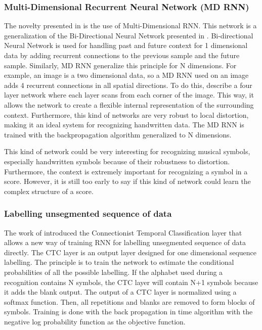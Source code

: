 \documentclass[11pt]{sdm}
\begin{document}
\subsubsection{Multi-Dimensional Recurrent Neural Network (MD RNN)}

The novelty presented in \cite{graves_offline_2009} is the use of Multi-Dimensional RNN.
This network is a generalization of the Bi-Directional Neural Network presented in \cite{schuster_bidirectional_1997}.
Bi-directional Neural Network is used for handling past and future context for 1 dimensional data by adding recurrent connections to the previous sample and the future sample.
Similarly, MD RNN generalize this principle for N dimensions.
For example, an image is a two dimensional data, so a MD RNN used on an image adds 4 recurrent connections in all spatial directions.
To do this, \cite{graves_offline_2009} describe a four layer network where each layer scans from each corner of the image.
This way, it allows the network to create a flexible internal representation of the surrounding context.
Furthermore, this kind of networks are very robust to local distortion, making it an ideal system for recognizing handwritten data.
The MD RNN is trained with the backpropagation algorithm generalized to N dimensions.

This kind of network could be very interesting for recognizing musical symbols, especially handwritten symbols because of their robustness to distortion.
Furthermore, the context is extremely important for recognizing a symbol in a score.
However, it is still too early to say if this kind of network could learn the complex structure of a score.

\subsubsection{Labelling unsegmented sequence of data}

The work of \cite{graves_connectionist_2006} introduced the Connectionist Temporal Classification layer that allows a new way of training RNN for labelling unsegmented sequence of data directly.
The CTC layer is an output layer designed for one dimensional sequence labelling.
The principle is to train the network to estimate the conditional probabilities of all the possible labelling.
If the alphabet used during a recognition contains N symbols, the CTC layer will contain N+1 symbols because it adds the blank output.
The output of a CTC layer is normalized using a softmax function.
Then, all repetitions and blanks are removed to form blocks of symbols.
Training is done with the back propagation in time algorithm with the negative log probability function as the objective function.
\end{document}

